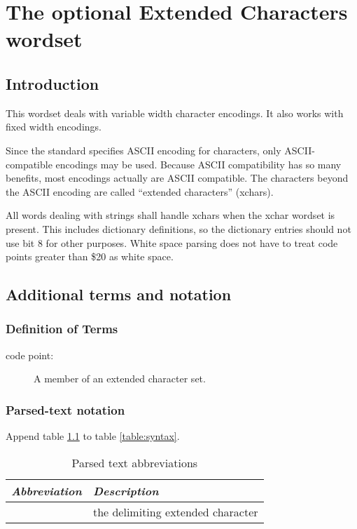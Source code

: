 \cbstart{}%
\chapter{The optional Extended Characters wordset} %

\section{Introduction} %

This wordset deals with variable width character encodings.  It also
works with fixed width encodings.

Since the standard specifies ASCII encoding for characters, only
ASCII-compatible encodings may be used.  Because ASCII compatibility
has so many benefits, most encodings actually are ASCII compatible.
The characters beyond the ASCII encoding are called ``extended
characters'' (xchars).

All words dealing with strings shall handle xchars when the xchar
wordset is present.  This includes dictionary definitions, so the
dictionary entries should not use bit 8 for other purposes.  White
space parsing does not have to treat code points greater than \$20
as white space.

\section{Additional terms and notation} %

\subsection{Definition of Terms} %

\begin{description}
\item[code point:] A member of an extended character set.
\end{description}

\subsection{Parsed-text notation}

Append table \ref{xchar:syntax} to table \ref{table:syntax}.

\begin{table}[ht]
	\begin{center}
		\caption{Parsed text abbreviations}
		\label{xchar:syntax}
		\begin{tabular}{ll}
		\hline\hline
			\emph{Abbreviation} & \emph{Description} \\ \hline
			\param{<xchar>} & the delimiting extended character \\
		\hline\hline
		\end{tabular}
	\end{center}
\end{table}

